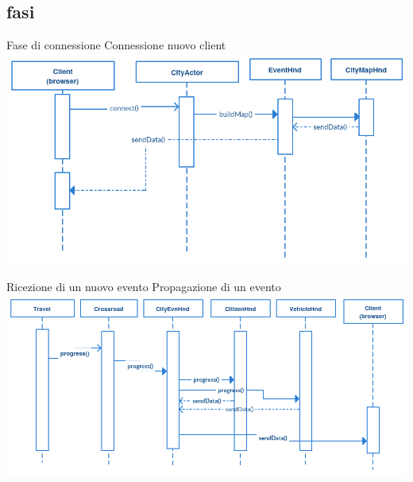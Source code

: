\subsection{fasi}
\begin{frame}{Fase di connessione}
	Connessione nuovo client
	\centering
	\includegraphics[scale=0.3]{images/connectionPhase.png}
\end{frame}

\begin{frame}{Ricezione di un nuovo evento}
	Propagazione di un evento
	\centering
	\includegraphics[scale=0.3]{images/eventTransmission.png}
\end{frame}

